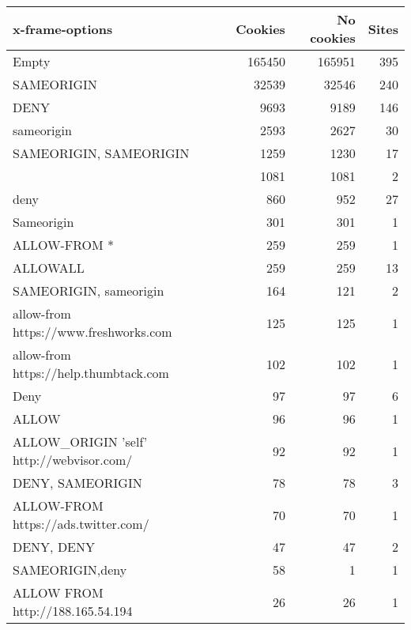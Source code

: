 \begin{tabular}{lrrr}
\toprule
                         x-frame-options &  Cookies &  No cookies &  Sites \\
\midrule
                                   Empty &   165450 &      165951 &    395 \\
                              SAMEORIGIN &    32539 &       32546 &    240 \\
                                    DENY &     9693 &        9189 &    146 \\
                              sameorigin &     2593 &        2627 &     30 \\
                  SAMEORIGIN, SAMEORIGIN &     1259 &        1230 &     17 \\
                                         &     1081 &        1081 &      2 \\
                                    deny &      860 &         952 &     27 \\
                              Sameorigin &      301 &         301 &      1 \\
                            ALLOW-FROM * &      259 &         259 &      1 \\
                                ALLOWALL &      259 &         259 &     13 \\
                  SAMEORIGIN, sameorigin &      164 &         121 &      2 \\
   allow-from https://www.freshworks.com &      125 &         125 &      1 \\
   allow-from https://help.thumbtack.com &      102 &         102 &      1 \\
                                    Deny &       97 &          97 &      6 \\
                                   ALLOW &       96 &          96 &      1 \\
ALLOW\_ORIGIN 'self' http://webvisor.com/ &       92 &          92 &      1 \\
                        DENY, SAMEORIGIN &       78 &          78 &      3 \\
     ALLOW-FROM https://ads.twitter.com/ &       70 &          70 &      1 \\
                              DENY, DENY &       47 &          47 &      2 \\
                         SAMEORIGIN,deny &       58 &           1 &      1 \\
        ALLOW FROM http://188.165.54.194 &       26 &          26 &      1 \\

\end{tabular}
